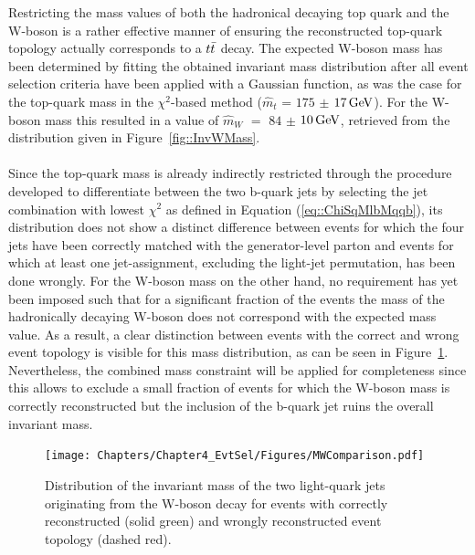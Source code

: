 Restricting the mass values of both the hadronical decaying top quark and the W-boson is a rather effective manner of ensuring the reconstructed top-quark topology actually corresponds to a $t\bar{t}$ decay.
The expected W-boson mass has been determined by fitting the obtained invariant mass distribution after all event selection criteria have been applied with a Gaussian function, as was the case for the top-quark mass in the $\chi^{2}$-based method ($\hat{m}_{t}$ = $175$ $\pm$ $17 \, \mathrm{GeV}$). For the W-boson mass this resulted in a value of $\hat{m}_{W}$ $=$ $84$ $\pm$ $10 \, \mathrm{GeV}$, retrieved from the distribution given in Figure~\ref{fig::InvWMass}.
\\
\\
Since the top-quark mass is already indirectly restricted through the procedure developed to differentiate between the two b-quark jets by selecting the jet combination with lowest $\chi^{2}$ as defined in Equation (\ref{eq::ChiSqMlbMqqb}), its distribution does not show a distinct difference between events for which the four jets have been correctly matched with the generator-level parton and events for which at least one jet-assignment, excluding the light-jet permutation, has been done wrongly. For the W-boson mass on the other hand, no requirement has yet been imposed such that for a significant fraction of the events the mass of the hadronically decaying W-boson does not correspond with the expected mass value. As a result, a clear distinction between events with the correct and wrong event topology is visible for this mass distribution, as can be seen in Figure~\ref{fig::MWGoodWrong}.
Nevertheless, the combined mass constraint will be applied for completeness since this allows to exclude a small fraction of events for which the W-boson mass is correctly reconstructed but the inclusion of the b-quark jet ruins the overall invariant mass.
\\
\begin{figure}[h!t]
 \centering
 \texttt{[image: Chapters/Chapter4\_EvtSel/Figures/MWComparison.pdf]}
 \caption{Distribution of the invariant mass of the two light-quark jets originating from the W-boson decay for events with correctly reconstructed (solid green) and wrongly reconstructed event topology (dashed red).} \label{fig::MWGoodWrong}
\end{figure}

